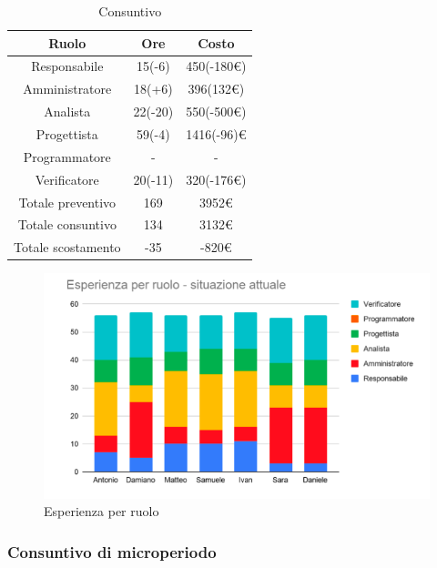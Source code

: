 \begin{table}[H]
	\centering
	\renewcommand{\arraystretch}{1.5}
	\begin{tabular}{|c|c|c|}
		\hline
		\rowcolor{lighter-grayer}
		Ruolo & Ore & Costo \\ \hline
		Responsabile & 15(-6) & 450(-180\euro) \\ \hline
		Amministratore & 18(+6) & 396(132\euro) \\ \hline
		Analista & 22(-20) & 550(-500\euro) \\ \hline
		Progettista & 59(-4) & 1416(-96)\euro \\ \hline
		Programmatore & - & - \\ \hline
		Verificatore & 20(-11) & 320(-176\euro) \\ \hline
		Totale preventivo & 169 & 3952\euro \\ \hline
		Totale consuntivo & 134 & 3132\euro \\ \hline
		Totale scostamento & -35 & -820\euro \\ \hline
	\end{tabular}
	\caption{ Consuntivo\\}
\end{table}
\begin{figure}[H]
	\centering
	\includegraphics[width=15cm]{res/images/GraficoRuoli.png}
	\caption{ Esperienza per ruolo}
	\label{fig:Esperienza per ruolo}
\end{figure}

\subsubsection{Consuntivo di microperiodo}
